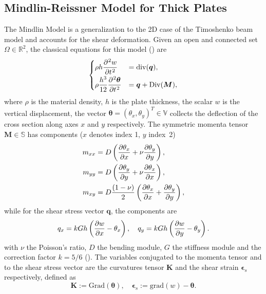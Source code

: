 \documentclass{ifacconf}
\begin{document}
\subsection{Mindlin-Reissner Model for Thick Plates}
\label{subsec:classMin}
The Mindlin Model is a generalization to the 2D case of the Timoshenko beam model and accounts for the shear deformation. Given an open and connected set $\Omega \in \mathbb{R}^2$, the classical equations for this model (\cite{mindlin}) are 
\begin{equation}
\begin{cases}
\displaystyle \rho h \diffp[2]{w}{t} &= \mathrm{div}(\bm{q}),  \vspace{1mm}\\
\displaystyle \rho\frac{h^3}{12} \diffp[2]{\bm \theta}{t} &= \bm{q} + \mathrm{Div}(\bm M), \\
\end{cases}
\end{equation}
where $\rho$ is the material density, $h$ is the plate thickness, the scalar $w$ is the vertical displacement, the vector $\bm \theta = (\theta_x, \theta_y)^T \in \mathbb{V}$ collects the deflection of the cross section along axes $x$ and $y$ respectively. The symmetric momenta tensor $\bm{M} \in \mathbb{S}$  has components ($x$ denotes index 1, $y$ index~2)
\begin{equation*}
\begin{aligned}
m_{xx} &= D\left(\diffp{\theta_x}{x} + \nu \diffp{\theta_y}{y}\right),\\
m_{yy} &= D\left(\diffp{\theta_y}{y} + \nu \diffp{\theta_x}{x}\right),\\
m_{xy} &= D \frac{(1 - \nu)}{2} \left(\diffp{\theta_x}{x} + \diffp{\theta_y}{y}\right), \\
\end{aligned}
\end{equation*}
while for the shear stress vector $\bm{q}$, the components are 
\begin{equation*}
q_{x} = k G h \left(\diffp{w}{x} - \theta_x \right), \quad q_{y} = k G h \left(\diffp{w}{y} - \theta_y \right). 
\end{equation*}
with $\nu$ the Poisson's ratio, $D$ the bending module, $G$ the stiffness module and the correction factor $k = 5/6$  (\cite{mindlin}). The variables conjugated to the momenta tensor and to the shear stress vector are the curvatures tensor $\bm{K}$ and the shear strain $\bm{\epsilon}_s$ respectively, defined as
\begin{equation*}
\bm{K} := \mathrm{Grad}(\bm{\theta}), \quad \bm{\epsilon}_s := \mathrm{grad}(w) - \bm{\theta}.
\end{equation*}
\end{document}
